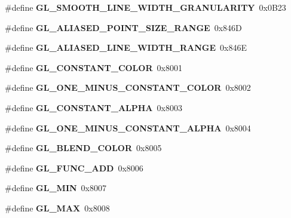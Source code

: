 \begin{DoxyCompactItemize}
\item 
\#define {\bfseries G\+L\+\_\+\+S\+M\+O\+O\+T\+H\+\_\+\+L\+I\+N\+E\+\_\+\+W\+I\+D\+T\+H\+\_\+\+G\+R\+A\+N\+U\+L\+A\+R\+I\+T\+Y}~0x0\+B23\label{_s_d_l__opengl_8h_aa5db837b996108c90673c2bc27976301}

\item 
\#define {\bfseries G\+L\+\_\+\+A\+L\+I\+A\+S\+E\+D\+\_\+\+P\+O\+I\+N\+T\+\_\+\+S\+I\+Z\+E\+\_\+\+R\+A\+N\+G\+E}~0x846\+D\label{_s_d_l__opengl_8h_a36db9789a611e54ea050f1368a5f38d7}

\item 
\#define {\bfseries G\+L\+\_\+\+A\+L\+I\+A\+S\+E\+D\+\_\+\+L\+I\+N\+E\+\_\+\+W\+I\+D\+T\+H\+\_\+\+R\+A\+N\+G\+E}~0x846\+E\label{_s_d_l__opengl_8h_aeab1bea19aab745e66b39860f3b8409c}

\item 
\#define {\bfseries G\+L\+\_\+\+C\+O\+N\+S\+T\+A\+N\+T\+\_\+\+C\+O\+L\+O\+R}~0x8001\label{_s_d_l__opengl_8h_a44a85282cd9022542edd9b29b44b4221}

\item 
\#define {\bfseries G\+L\+\_\+\+O\+N\+E\+\_\+\+M\+I\+N\+U\+S\+\_\+\+C\+O\+N\+S\+T\+A\+N\+T\+\_\+\+C\+O\+L\+O\+R}~0x8002\label{_s_d_l__opengl_8h_aa9fd0672b1352e0a68a7cf268df3734e}

\item 
\#define {\bfseries G\+L\+\_\+\+C\+O\+N\+S\+T\+A\+N\+T\+\_\+\+A\+L\+P\+H\+A}~0x8003\label{_s_d_l__opengl_8h_aa8e645785d8215f658c2576d90df1e5d}

\item 
\#define {\bfseries G\+L\+\_\+\+O\+N\+E\+\_\+\+M\+I\+N\+U\+S\+\_\+\+C\+O\+N\+S\+T\+A\+N\+T\+\_\+\+A\+L\+P\+H\+A}~0x8004\label{_s_d_l__opengl_8h_a316d4feb613d04854aba437a278add28}

\item 
\#define {\bfseries G\+L\+\_\+\+B\+L\+E\+N\+D\+\_\+\+C\+O\+L\+O\+R}~0x8005\label{_s_d_l__opengl_8h_aaeb7ae1c6700f8dc186672a2abdd825e}

\item 
\#define {\bfseries G\+L\+\_\+\+F\+U\+N\+C\+\_\+\+A\+D\+D}~0x8006\label{_s_d_l__opengl_8h_af477e4fa3e741406c0c3532cc5062758}

\item 
\#define {\bfseries G\+L\+\_\+\+M\+I\+N}~0x8007\label{_s_d_l__opengl_8h_a9aa39c311e7b5958879e80579cc129aa}

\item 
\#define {\bfseries G\+L\+\_\+\+M\+A\+X}~0x8008\label{_s_d_l__opengl_8h_ad615339259858b91f67bf893e2a0b1b7}


\end{DoxyCompactItemize}
